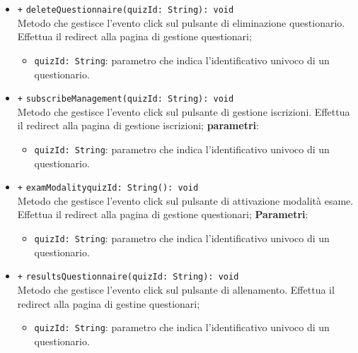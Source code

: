 \begin{itemize}
\begin{itemize}
\begin{itemize}
		\end{itemize}
		\item \texttt{+} \texttt{deleteQuestionnaire(quizId: String): void} \\
		Metodo che gestisce l’evento click sul pulsante di eliminazione questionario. Effettua il redirect alla pagina di gestione questionari;  
		\begin{itemize}
			\item \texttt{quizId: String}: parametro che indica l'identificativo univoco di un questionario.
		\end{itemize}
		\item \texttt{+} \texttt{subscribeManagement(quizId: String): void} \\
		Metodo che gestisce l’evento click sul pulsante di gestione iscrizioni. Effettua il redirect alla pagina di gestione iscrizioni;
		\textbf{parametri}:
		\begin{itemize}
			\item \texttt{quizId: String}: parametro che indica l'identificativo univoco di un questionario.
		\end{itemize}
		\item \texttt{+} \texttt{examModalityquizId: String(): void} \\Metodo che gestisce l’evento click sul pulsante di attivazione modalità esame. Effettua il redirect alla pagina di gestione questionari;
		\textbf{Parametri}:
		\begin{itemize}
			\item \texttt{quizId: String}: parametro che indica l'identificativo univoco di un questionario.
		\end{itemize}
		\item \texttt{+} \texttt{resultsQuestionnaire(quizId: String): void} \\
		Metodo che gestisce l’evento click sul pulsante di allenamento. Effettua il redirect alla pagina di gestine questionari;
		\begin{itemize}
			\item \texttt{quizId: String}: parametro che indica l'identificativo univoco di un questionario.
		\end{itemize}   
	\end{itemize}
\end{itemize}